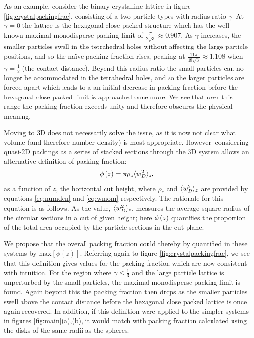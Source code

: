 As an example, consider the binary crystalline lattice in figure \ref{fig:crystalpackingfrac}, consisting of a two particle types with radius ratio $\gamma$.
At $\gamma=0$ the lattice is the hexagonal close packed structure which has the well known maximal monodisperse packing limit of $\frac{\pi}{2\sqrt{3}}\approx0.907$.
As $\gamma$ increases, the smaller particles swell in the tetrahedral holes without affecting the large particle positions, and so the na\"ive \td{} packing fraction rises, peaking at $\frac{11\pi}{18\sqrt{3}}\approx1.108$ when $\gamma=\frac{1}{3}$ (the contact distance).
Beyond this radius ratio the small particles can no longer be accommodated in the tetrahedral holes, and so the larger particles are forced apart which leads to a an initial decrease in packing fraction before the hexagonal close packed limit is approached once more.
We see that over this range the packing fraction exceeds unity and therefore obscures the physical meaning.

Moving to 3D does not necessarily solve the issue, as it is now not clear what volume (and therefore number density) is most appropriate.
However, considering quasi\--2D packings as a series of stacked sections through the 3D system allows an alternative definition of packing fraction:
\begin{equation}
	\label{eq:packingfrac}
	\phi\left(z\right) = \pi\rho_z\langle w_D^2 \rangle_z,
\end{equation}
as a function of $z$, the horizontal cut height, where $\rho_z$ and $\langle w_D^2 \rangle_z$ are provided by equations \eqref{eq:numden} and \eqref{eq:wmom} respectively.
The rationale for this equation is as follows. 
As the value, $\langle w_D^2 \rangle_z$, measures the average square radius of the circular sections in a cut of given height; here $\phi\left(z\right)$ quantifies the proportion of the total area occupied by the particle sections in the cut plane.

We propose that the overall packing fraction could thereby by quantified in these systems by $\text{max}\left[\phi\left(z\right)\right]$.
Referring again to figure \ref{fig:crystalpackingfrac}, we see that this definition gives values for the packing fraction which are now consistent with intuition.
For the region where $\gamma\leq\frac{1}{3}$ and the large particle lattice is unperturbed by the small particles, the maximal monodisperse packing limit is found.
Again beyond this the packing fraction then drops as the smaller particles swell above the contact distance before the hexagonal close packed lattice is once again recovered.
In addition, if this definition were applied to the simpler systems in figures \ref{fig:main}(a),(b), it would match with packing fraction calculated using the disks of the same radii as the spheres. 

